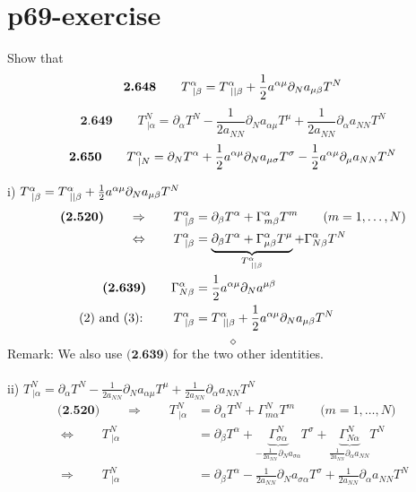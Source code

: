\section{p69-exercise}
\begin{tcolorbox}
Show that
$$\textbf{2.648}\quad\quad T^{\alpha}_{\ |\beta} = T^{\alpha}_{\ ||\beta} + \frac{1}{2} a^{\alpha \mu} \partial_N a_{\mu\beta}T^N$$
$$\textbf{2.649}\quad\quad T^{N}_{\ |\alpha} = \partial_{\alpha}T^{N} - \frac{1}{2 a_{NN}} \partial_N a_{\alpha\mu}T^{\mu} + \frac{1}{2 a_{NN}} \partial_{\alpha} a_{NN}T^{N}$$
$$\textbf{2.650}\quad\quad T^{\alpha}_{\ |N} = \partial_{N}T^{\alpha}  + \frac{1}{2} a^{\alpha\mu} \partial_N a_{\mu\sigma}T^{\sigma} - \frac{1}{2} a^{\alpha\mu}  \partial_{\mu} a_{NN}T^{N}$$
\end{tcolorbox}
i) $T^{\alpha}_{\ |\beta} = T^{\alpha}_{\ ||\beta} + \half a^{\alpha \mu} \partial_N a_{\mu\beta}T^N$\\
\begin{align}
\textbf{(2.520)}\quad\quad \Rightarrow \quad\quad T^{\alpha}_{\ |\beta} &= \partial_{\beta}T^{\alpha}+\Gamma^{\alpha}_{m\beta}T^m \quad\quad\text{(}m = 1,\dots,N \text{)}\\
\Leftrightarrow \quad\quad T^{\alpha}_{\ |\beta} &= \underbrace{ \partial_{\beta}T^{\alpha}+ \Gamma^{\alpha}_{\mu \beta} T^{\mu}}_{T^{\alpha}_{ \ || \beta}} +\Gamma^{\alpha}_{N \beta}T^{N}\\
\textbf{(2.639)}\quad\quad \Gamma^{\alpha}_{N\beta} &= \frac{1}{2} a^{\alpha \mu}\partial_N a^{\mu \beta}\\
\text{(2) and (3): }\quad\quad T^{\alpha}_{\ |\beta} &= T^{\alpha}_{\ ||\beta} + \frac{1}{2} a^{\alpha \mu} \partial_N a_{\mu\beta}T^N
\end{align}
$$\diamond$$
Remark: We also use $\textbf{(2.639)}$ for the two other identities.\\\\
ii) $T^{N}_{\ |\alpha} = \partial_{\alpha}T^{N} - \frac{1}{2 a_{NN}} \partial_N a_{\alpha\mu}T^{\mu} + \frac{1}{2 a_{NN}} \partial_{\alpha} a_{NN}T^{N}$\\
\begin{align}
\textbf{(2.520)}\quad\quad \Rightarrow \quad\quad T^{N}_{\ |\alpha} &= \partial_{\alpha}T^{N}+\Gamma^{N}_{m\alpha}T^m \quad\quad\text{(}m = 1,\dots,N \text{)}\\
\Leftrightarrow \quad\quad T^{N}_{\ |\alpha} &=  \partial_{\beta}T^{\alpha}+ \underbrace{\Gamma^{N}_{\sigma \alpha}}_{ - \frac{1}{2a_{NN}}\partial_N a_{\sigma\alpha}} T^{\sigma } +\underbrace{\Gamma^{N}_{N \alpha}}_{ \frac{1}{2a_{NN}}\partial_{\alpha} a_{NN}}T^{N}\\
\Rightarrow \quad\quad T^{N}_{\ |\alpha} &=  \partial_{\beta}T^{\alpha} - \frac{1}{2a_{NN}}\partial_N a_{\sigma\alpha}T^{\sigma } +\frac{1}{2a_{NN}}\partial_{\alpha} a_{NN}T^{N}
\end{align}\\
